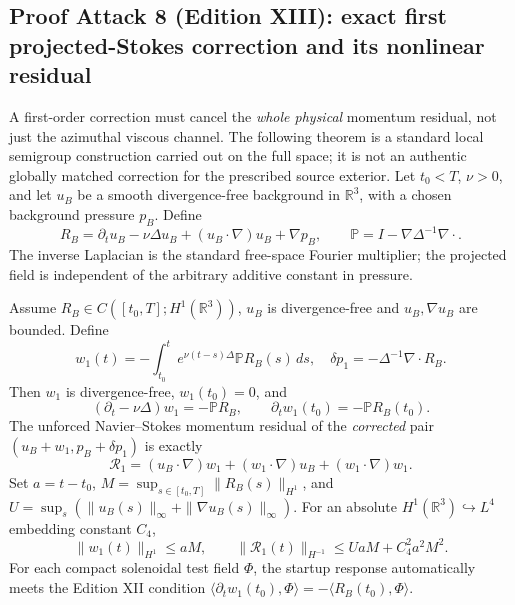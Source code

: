 \subsection*{Proof Attack 8 (Edition XIII): exact first projected-Stokes correction and its nonlinear residual}
\label{subsec:n1-projected-stokes-XIII}
A first-order correction must cancel the \emph{whole physical} momentum residual, not just the azimuthal viscous channel. The following theorem is a standard local semigroup construction carried out on the full space; it is not an authentic globally matched correction for the prescribed source exterior.
Let $t_0<T$, $\nu>0$, and let $u_B$ be a smooth divergence-free background in $\mathbb R^3$, with a chosen background pressure $p_B$. Define
\[
R_B=\partial_tu_B-\nu\Delta u_B+(u_B\cdot\nabla)u_B+\nabla p_B,
\qquad \mathbb P=I-\nabla\Delta^{-1}\nabla\cdot.
\]
The inverse Laplacian is the standard free-space Fourier multiplier; the projected field is independent of the arbitrary additive constant in pressure.
\begin{theorem}
Assume $R_B\in C([t_0,T];H^1(\mathbb R^3))$, $u_B$ is divergence-free and $u_B,\nabla u_B$ are bounded. Define
\begin{equation}\label{eq:XIII-first-corrector}
 w_1(t)=-\int_{t_0}^t e^{\nu(t-s)\Delta}\mathbb P R_B(s)\,ds,
\quad \delta p_1=-\Delta^{-1}\nabla\cdot R_B.
\end{equation}
Then $w_1$ is divergence-free, $w_1(t_0)=0$, and
\begin{equation}\label{eq:XIII-corrected-jet}
(\partial_t-\nu\Delta)w_1=-\mathbb P R_B,
\qquad \partial_tw_1(t_0)=-\mathbb P R_B(t_0).
\end{equation}
The unforced Navier--Stokes momentum residual of the \emph{corrected} pair $(u_B+w_1,p_B+\delta p_1)$ is exactly
\begin{equation}\label{eq:XIII-exact-leftover}
\boxed{\mathcal R_1=(u_B\cdot\nabla)w_1+(w_1\cdot\nabla)u_B+(w_1\cdot\nabla)w_1.}
\end{equation}
Set $a=t-t_0$, $M=\sup_{s\in[t_0,T]}\|R_B(s)\|_{H^1}$, and $U=\sup_s(\|u_B(s)\|_{\infty}+\|\nabla u_B(s)\|_{\infty})$. For an absolute $H^1(\mathbb R^3)\hookrightarrow L^4$ embedding constant $C_4$,
\begin{equation}\label{eq:XIII-time-remainder-bound}
\boxed{\|w_1(t)\|_{H^1}\le aM,\qquad
\|\mathcal R_1(t)\|_{H^{-1}}\le UaM+C_4^2a^2M^2.}
\end{equation}
For each compact solenoidal test field $\Phi$, the startup response automatically meets the Edition XII condition
$\langle\partial_tw_1(t_0),\Phi\rangle=-\langle R_B(t_0),\Phi\rangle$.
\end{theorem}
